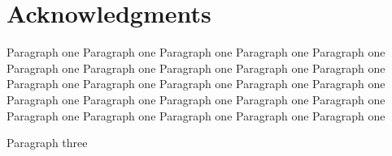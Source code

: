 \documentclass[10pt,journal,final,a4paper,nofonttune]{IEEEtran}
\begin{document}
\section*{Acknowledgments}

Paragraph one Paragraph one Paragraph one Paragraph one Paragraph one 
Paragraph one Paragraph one Paragraph one Paragraph one Paragraph one 
Paragraph one Paragraph one Paragraph one Paragraph one Paragraph one 
Paragraph one Paragraph one Paragraph one Paragraph one Paragraph one 
Paragraph one Paragraph one Paragraph one Paragraph one Paragraph one 

Paragraph three



\end{document}
